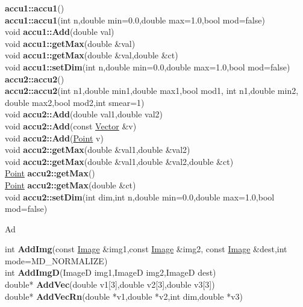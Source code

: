 \documentclass[10pt,titlepage]{article}
\def\functionlistentry#1#2#3#4#5#6{\noindent #1 {\bf #2}(#3) \dotfill #6\\}
\def\letterref#1{}
\def\letterlabel#1{\vspace{0.5cm}\centerline{\Large #1}}
\def\letterlabelend#1{}
\begin{document}
{{\letterref{Ac}
\letterref{Ad}
\letterref{Af}
\letterref{Al}
\letterref{An}
\letterref{Ap}
\letterref{Ar}
\letterref{As}
\letterlabelend{Ac}
\functionlistentry{}{accu1::accu1}{}{917}{statistics}{}
\functionlistentry{}{accu1::accu1}{int n,double min=0.0,double max=1.0,bool mod=false}{919}{statistics}{}
\functionlistentry{void}{accu1::Add}{double val}{923}{statistics}{}
\functionlistentry{void}{accu1::getMax}{double \&val}{927}{statistics}{}
\functionlistentry{void}{accu1::getMax}{double \&val,double \&ct}{928}{statistics}{}
\functionlistentry{void}{accu1::setDim}{int n,double min=0.0,double max=1.0,bool mod=false}{921}{statistics}{}
\functionlistentry{}{accu2::accu2}{}{918}{statistics}{}
\functionlistentry{}{accu2::accu2}{int n1,double min1,double max1,bool mod1, int n1,double min2, double max2,bool mod2,int smear=1}{920}{statistics}{}
\functionlistentry{void}{accu2::Add}{double val1,double val2}{924}{statistics}{}
\functionlistentry{void}{accu2::Add}{const \hyperlink{Vector}{Vector} \&v}{925}{statistics}{}
\functionlistentry{void}{accu2::Add}{\hyperlink{Point}{Point} v}{926}{statistics}{}
\functionlistentry{void}{accu2::getMax}{double \&val1,double \&val2}{929}{statistics}{}
\functionlistentry{void}{accu2::getMax}{double \&val1,double \&val2,double \&ct}{930}{statistics}{}
\functionlistentry{\hyperlink{Point}{Point}}{accu2::getMax}{}{931}{statistics}{}
\functionlistentry{\hyperlink{Point}{Point}}{accu2::getMax}{double \&ct}{932}{statistics}{}
\functionlistentry{void}{accu2::setDim}{int dim,int n,double min=0.0,double max=1.0,bool mod=false}{922}{statistics}{}

\letterlabel{Ad}
\letterref{A}
\letterref{B}
\letterref{C}
\letterref{D}
\letterref{E}
\letterref{F}
\letterref{G}
\letterref{H}
\letterref{I}
\letterref{K}
\letterref{L}
\letterref{M}
\letterref{N}
\letterref{O}
\letterref{P}
\letterref{Q}
\letterref{R}
\letterref{S}
\letterref{T}
\letterref{U}
\letterref{V}
\letterref{W}
\letterref{X}
\letterref{Y}
\letterref{Z}

\letterref{Ac}
\letterref{Ad}
\letterref{Af}
\letterref{Al}
\letterref{An}
\letterref{Ap}
\letterref{Ar}
\letterref{As}
\letterlabelend{Ad}
\functionlistentry{int}{AddImg}{const \hyperlink{Image}{Image} \&img1,const \hyperlink{Image}{Image} \&img2, const \hyperlink{Image}{Image} \&dest,int mode=MD\_NORMALIZE}{1087}{processing}{}
\functionlistentry{int}{AddImgD}{ImageD img1,ImageD img2,ImageD dest}{1098}{processing}{}
\functionlistentry{double*}{AddVec}{double v1[3],double v2[3],double v3[3]}{1558}{obsolet}{}
\functionlistentry{double*}{AddVecRn}{double *v1,double *v2,int dim,double *v3}{1568}{obsolet}{}

}}
\end{document}
